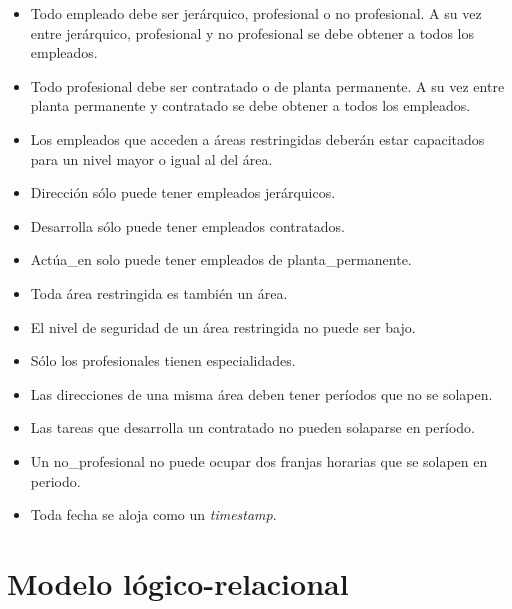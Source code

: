 \begin{itemize}
    \item Todo empleado debe ser jerárquico, profesional o no profesional. A su
        vez entre jerárquico, profesional y no profesional se debe obtener a 
        todos los empleados.
    \item Todo profesional debe ser contratado o de planta permanente. A su vez 
        entre planta permanente y contratado se debe obtener a todos los 
        empleados.
    \item Los empleados que acceden a áreas restringidas deberán estar 
        capacitados para un nivel mayor o igual al del área.
    \item Dirección sólo puede tener empleados jerárquicos.
    \item Desarrolla sólo puede tener empleados contratados.
    \item Actúa\_en solo puede tener empleados de planta\_permanente.
    \item Toda área restringida es también un área.
    \item El nivel de seguridad de un área restringida no puede ser bajo.
    \item Sólo los profesionales tienen especialidades.
    \item Las direcciones de una misma área deben tener períodos que no se 
        solapen.
    \item Las tareas que desarrolla un contratado no pueden solaparse en 
        período.
    \item Un no\_profesional no puede ocupar dos franjas horarias que se solapen
        en periodo.
    \item Toda fecha se aloja como un \textit{timestamp}.
\end{itemize}

\section{Modelo lógico-relacional}

\newcommand{\pk}[1]{\underline{#1}}
\newcommand{\fk}[1]{\dashuline{#1}}
\newcommand{\ent}[1]{\uppercase{\texttt{#1}}}
\newcommand{\att}[1]{\texttt{\makefirstuc{#1}}}
\newcommand{\CK}[1]{CK=\{(#1)\}}
\newcommand{\FK}[1]{FK=\{(#1)\}}
\newcommand{\PK}[1]{PK=\{(#1)\}}
\newcommand{\fmin}[2]{$F_{\text{mín}}$: \{#1\} $\rightarrow$ \{#2\}}

